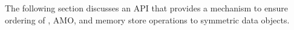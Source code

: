 The following section discusses an \openshmem \ac{API} that provides a mechanism to ensure ordering of , \ac{AMO}, and memory store operations to symmetric data 
objects. 